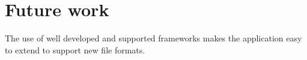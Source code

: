 \chapter{Future work}
The use of well developed and supported frameworks makes the application easy to extend to support new file formats.


